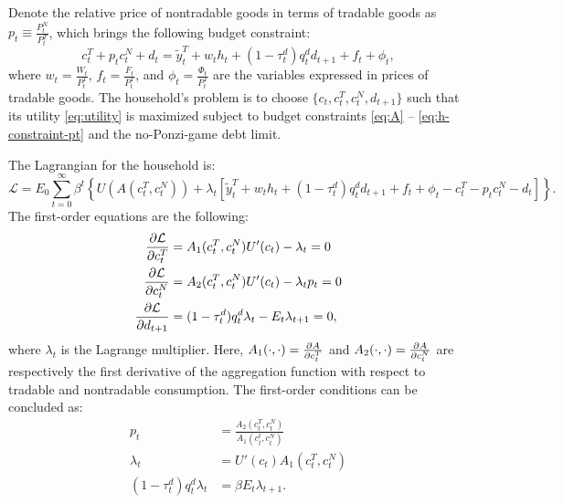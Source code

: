 Denote the relative price of nontradable goods in terms of tradable goods as $p_t \equiv \frac{P^N_t}{P^T_t}$, which brings the following budget constraint:
\begin{equation}
    \label{eq:h-constraint-pt}
    c^T_t + p_t c^N_t +  d_t =
     \tilde{y}^T_t + w_t h_t + (1- \tau^d_t) q^d_t d_{t+1} + f_t + \phi_t,
\end{equation}
where $w_t = \frac{W_t}{P^T_t}$, $f_t = \frac{F_t}{P^T_t}$, and $\phi_t = \frac{\Phi_t}{P^T_t}$ are the variables expressed in prices of tradable goods.
The household's problem is to choose $\{c_t, c_t^T, c_t^N, d_{t+1}\}$ such that its utility \eqref{eq:utility} is maximized subject to budget constraints \eqref{eq:A} -- \eqref{eq:h-constraint-pt} and the no-Ponzi-game debt limit.

The Lagrangian for the household is:
\begin{equation*}
    \mathcal{L} = E_0 \sum_{t=0}^\infty \beta^t \left\{
        U(A(c^T_t, c^N_t)) + \lambda_t \left[
            \tilde{y}^T_t + w_t h_t + (1- \tau^d_t) q^d_t d_{t+1} + f_t + \phi_t -
            c^T_t - p_t c^N_t -  d_t
         \right]
     \right\}.
\end{equation*}
The first-order equations are the following:
\begin{align*}
    \pdv{\mathcal{L}}{c^T_t} &= A_1(c^T_t, c^N_t) U'(c_t) - \lambda_t = 0\\
    \pdv{\mathcal{L}}{c^N_t} &= A_2 (c^T_t, c^N_t) U'(c_t) - \lambda_t p_t = 0 \\
    \pdv{\mathcal{L}}{d_{t+1}} &= (1 - \tau^d_t)q^d_t \lambda_{t} - E_{t} \lambda_{t+1} = 0,
\end{align*}
where $\lambda_t$ is the Lagrange multiplier.
Here,
$A_1(\cdot, \cdot) = \pdv{A}{c^T_t}$ and $A_2(\cdot, \cdot) = \pdv{A}{c^N_t}$ are respectively the first derivative of the aggregation function with respect to tradable and nontradable consumption.
The first-order conditions can be concluded as:
\begin{subequations}
    \begin{align}
        p_t &= \frac{A_2(c_t^T, c_t^N)}{A_1(c_t^t, c_t^N)} \label{eq:FOC-HH-1} \\
        \lambda_t &= U'(c_t)A_1(c_t^T, c_t^N)\\
        (1-\tau_t^d)q_t^d \lambda_t &= \beta E_t \lambda_{t+1}. \label{eq:FOC-HH-3}
    \end{align}
\end{subequations}